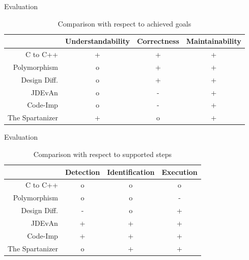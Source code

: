 \documentclass{beamer}
\begin{document}
\begin{frame}{Evaluation}	
	\begin{table}[htb]
		\centering
		\caption{Comparison with respect to achieved goals}
		\label{tbl:goals}
		\begin{tabular}{r|ccc}
			~               & Understandability & Correctness & Maintainability \\ \hline
			C to C++        & +                 & +           & + \\
			Polymorphism    & o                 & +           & + \\
			Design Diff.    & o                 & +           & + \\
			JDEvAn          & o                 & -           & + \\
			Code-Imp        & o                 & -           & + \\
			The Spartanizer & +                 & o           & + \\
		\end{tabular}
	\end{table}
\end{frame}

\begin{frame}{Evaluation}
	\begin{table}[htb]
		\centering
		\caption{Comparison with respect to supported steps}
		\label{tbl:steps}
		\begin{tabular}{r|ccc}
			~               & Detection & Identification  & Execution \\ \hline
			C to C++        & o         & o               & o \\
			Polymorphism    & o         & o               & - \\
			Design Diff.    & -         & o               & + \\
			JDEvAn          & +         & +               & + \\
			Code-Imp        & +         & +               & + \\
			The Spartanizer & o         & +               & + \\
		\end{tabular}
	\end{table}
\end{frame}

\appendix
\section*{\appendixname}
\end{document}
